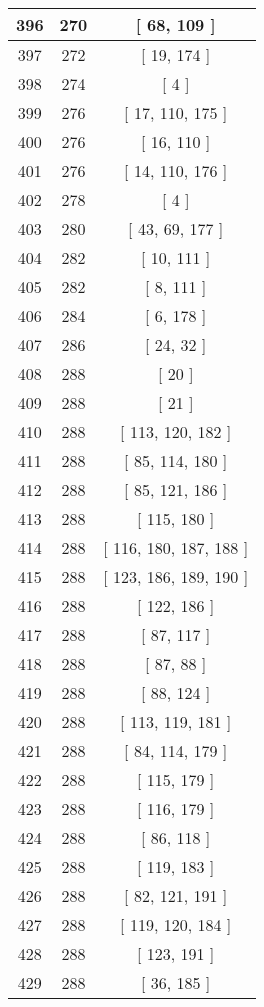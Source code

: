 \begin{center}
\begin{longtable}[H]{|| c c c ||}
\hline
396 & 270 & [ 68, 109 ] \\ 
\hline
397 & 272 & [ 19, 174 ] \\ 
\hline
398 & 274 & [ 4 ] \\ 
\hline
399 & 276 & [ 17, 110, 175 ] \\ 
\hline
400 & 276 & [ 16, 110 ] \\ 
\hline
401 & 276 & [ 14, 110, 176 ] \\ 
\hline
402 & 278 & [ 4 ] \\ 
\hline
403 & 280 & [ 43, 69, 177 ] \\ 
\hline
404 & 282 & [ 10, 111 ] \\ 
\hline
405 & 282 & [ 8, 111 ] \\ 
\hline
406 & 284 & [ 6, 178 ] \\ 
\hline
407 & 286 & [ 24, 32 ] \\ 
\hline
408 & 288 & [ 20 ] \\ 
\hline
409 & 288 & [ 21 ] \\ 
\hline
410 & 288 & [ 113, 120, 182 ] \\ 
\hline
411 & 288 & [ 85, 114, 180 ] \\ 
\hline
412 & 288 & [ 85, 121, 186 ] \\ 
\hline
413 & 288 & [ 115, 180 ] \\ 
\hline
414 & 288 & [ 116, 180, 187, 188 ] \\ 
\hline
415 & 288 & [ 123, 186, 189, 190 ] \\ 
\hline
416 & 288 & [ 122, 186 ] \\ 
\hline
417 & 288 & [ 87, 117 ] \\ 
\hline
418 & 288 & [ 87, 88 ] \\ 
\hline
419 & 288 & [ 88, 124 ] \\ 
\hline
420 & 288 & [ 113, 119, 181 ] \\ 
\hline
421 & 288 & [ 84, 114, 179 ] \\ 
\hline
422 & 288 & [ 115, 179 ] \\ 
\hline
423 & 288 & [ 116, 179 ] \\ 
\hline
424 & 288 & [ 86, 118 ] \\ 
\hline
425 & 288 & [ 119, 183 ] \\ 
\hline
426 & 288 & [ 82, 121, 191 ] \\ 
\hline
427 & 288 & [ 119, 120, 184 ] \\ 
\hline
428 & 288 & [ 123, 191 ] \\ 
\hline
429 & 288 & [ 36, 185 ] \\ 

\end{longtable}
\end{center}
